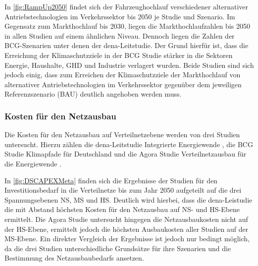 In \autoref{fig:RampUp2050} findet sich der Fahrzeughochlauf verschiedener alternativer Antriebstechnologien im Verkehrssektor bis \num{2050} je Studie und Szenario.
Im Gegensatz zum Markthochlauf bis \num{2030}, liegen die Markthochlaufzahlen bis \num{2050} in allen Studien auf einem ähnlichen Niveau.
Dennoch liegen die Zahlen der BCG-Szenarien unter denen der dena-Leitstudie.
Der Grund hierfür ist, dass die Erreichung der Klimaschutzziele in der BCG Studie stärker in die Sektoren Energie, Haushalte, \gls{GHD} und Industrie verlagert wurden.
Beide Studien sind sich jedoch einig, dass zum Erreichen der Klimaschutzziele der Markthochlauf von alternativer Antriebstechnologien im Verkehrssektor gegenüber dem jeweiligen Referenzszenario (\gls{BAU}) deutlich angehoben werden muss.


\subsubsection{Kosten für den Netzausbau}

Die Kosten für den Netzausbau auf Verteilnetzebene werden von drei Studien untersucht.
Hierzu zählen die dena-Leitstudie \glqq Integrierte Energiewende\grqq{} \cite{DEAGH2018}, die BCG Studie \glqq Klimapfade für Deutschland\grqq{} \cite{BCG2018} und die Agora Studie \glqq Verteilnetzausbau für die Energiewende\grqq{} \cite{Agora2019}.



In \autoref{fig:DSCAPEXMeta} finden sich die Ergebnisse der Studien für den Investitionsbedarf in die Verteilnetze bis zum Jahr \num{2050} aufgeteilt auf die drei Spannungsebenen \gls{NS}, \gls{MS} und \gls{HS}.
Deutlich wird hierbei, dass die dena-Leistudie die mit Abstand höchsten Kosten für den Netzausbau auf \gls{NS}- und \gls{HS}-Ebene ermittelt.
Die Agora Studie untersucht hingegen die Netzausbaukosten nicht auf der \gls{HS}-Ebene, ermittelt jedoch die höchsten Ausbaukosten aller Studien auf der \gls{MS}-Ebene.
Ein direkter Vergleich der Ergebnisse ist jedoch nur bedingt möglich, da die drei Studien unterschiedliche Grundsätze für ihre Szenarien und die Bestimmung des Netzausbaubedarfs ansetzen.\medskip

